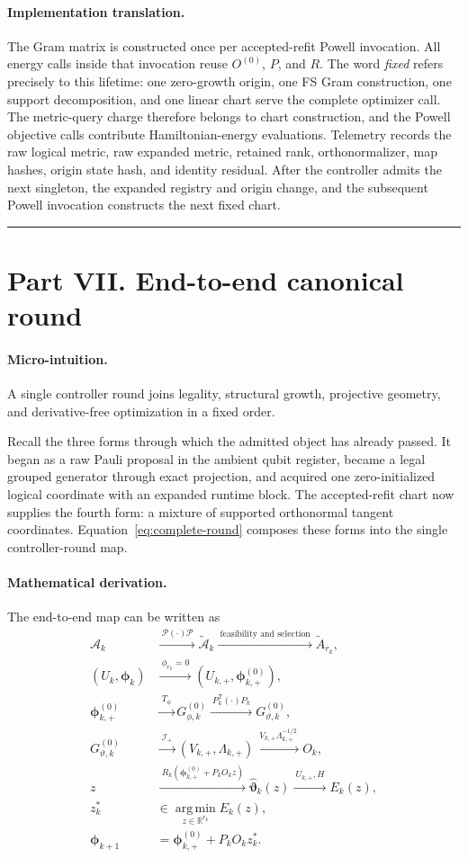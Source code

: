 \documentclass[10pt,twocolumn]{article}
\newcommand{\R}{\mathbb R}
\newcommand{\conceptbreak}{%
  \par\medskip\noindent
  {\color{black!30}\rule{\columnwidth}{0.35pt}}%
  \par\medskip}
\newcommand{\micro}{\paragraph{Micro-intuition.}}
\newcommand{\mathderiv}{\paragraph{Mathematical derivation.}}
\newcommand{\impl}{\paragraph{Implementation translation.}}
\begin{document}
\impl The Gram matrix is constructed once per accepted-refit Powell invocation.
All energy calls inside that invocation reuse \(O^{(0)}\), \(P\), and \(R\).
The word \emph{fixed} refers precisely to this lifetime: one zero-growth
origin, one FS Gram construction, one support decomposition, and one linear
chart serve the complete optimizer call. The metric-query charge therefore
belongs to chart construction, and the Powell objective calls contribute
Hamiltonian-energy evaluations. Telemetry records the raw logical metric, raw
expanded metric, retained rank, orthonormalizer, map hashes, origin state hash,
and identity residual. After the controller admits the next singleton, the
expanded registry and origin change, and the subsequent Powell invocation
constructs the next fixed chart.

\conceptbreak

\section*{Part VII. End-to-end canonical round}

\micro A single controller round joins legality, structural growth, projective
geometry, and derivative-free optimization in a fixed order.

Recall the three forms through which the admitted object has already passed.
It began as a raw Pauli proposal in the ambient qubit register, became a legal
grouped generator through exact projection, and acquired one zero-initialized
logical coordinate with an expanded runtime block. The accepted-refit chart
now supplies the fourth form: a mixture of supported orthonormal tangent
coordinates. Equation~\eqref{eq:complete-round} composes these forms into the
single controller-round map.

\mathderiv The end-to-end map can be written as
\begin{equation}
\begin{aligned}
\mathcal A_k
&\xrightarrow{\ \mathcal P(\cdot)\mathcal P\ }
\widetilde{\mathcal A}_k
\xrightarrow{\ \text{feasibility and selection}\ }
\widetilde A_{r_k},\\
(U_k,\bm\phi_k)
&\xrightarrow{\ \phi_{r_k}=0\ }
(U_{k,+},\bm\phi_{k,+}^{(0)}),\\
\bm\phi_{k,+}^{(0)}
&\xrightarrow{\ T_\phi\ }
G_{\phi,k}^{(0)}
\xrightarrow{\ P_k^{\mathsf T}(\cdot)P_k\ }
G_{\vartheta,k}^{(0)},\\
G_{\vartheta,k}^{(0)}
&\xrightarrow{\ \mathcal I_+\ }
(V_{k,+},\Lambda_{k,+})
\xrightarrow{\ V_{k,+}\Lambda_{k,+}^{-1/2}\ }
O_k,\\
z
&\xrightarrow{\ R_k(\bm\phi_{k,+}^{(0)}+P_kO_kz)\ }
\widehat{\bm\vartheta}_k(z)
\xrightarrow{\ U_{k,+},H\ }
E_k(z),\\
z_k^*&\in\operatorname*{arg\,min}_{z\in\R^{r_k}}E_k(z),\\
\bm\phi_{k+1}
&=\bm\phi_{k,+}^{(0)}+P_kO_kz_k^*.
\end{aligned}
\label{eq:complete-round}
\end{equation}
\end{document}
